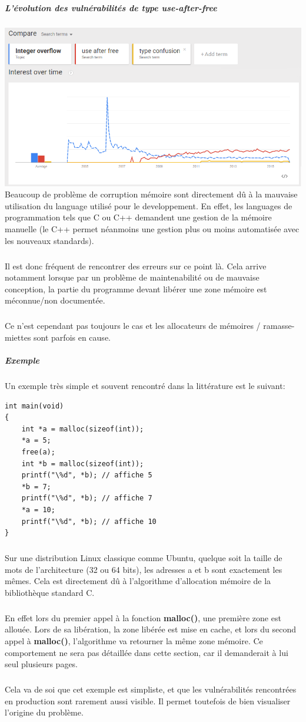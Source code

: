\subparagraph{L'évolution des vulnérabilités de type use-after-free}
\includegraphics[scale=0.5]{histogramme-uaf.png}\newline
Beaucoup de problème de corruption mémoire sont directement dû à la mauvaise utilisation
du language utilisé pour le developpement. En effet, les languages de programmation tels que C
ou C++ demandent une gestion de la mémoire manuelle (le C++ permet néanmoins une gestion plus ou moins automatisée
avec les nouveaux standards).
\subparagraph{}
Il est donc fréquent de rencontrer des erreurs sur ce point là. Cela arrive
notamment lorsque par un problème de maintenabilité ou de mauvaise conception, la partie du programme devant
libérer une zone mémoire est méconnue/non documentée.\subparagraph{}
Ce n'est cependant pas toujours le cas et les allocateurs de mémoires / ramasse-miettes sont parfois en cause.

\subparagraph{Exemple}
Un exemple très simple et souvent rencontré dans la littérature est le suivant:
\begin {lstlisting}[frame=single]
int main(void)
{
    int *a = malloc(sizeof(int));
    *a = 5;
    free(a);
    int *b = malloc(sizeof(int));
    printf("\%d", *b); // affiche 5
    *b = 7;
    printf("\%d", *b); // affiche 7
    *a = 10;
    printf("\%d", *b); // affiche 10
}
\end{lstlisting}
\subparagraph{}
Sur une distribution Linux classique comme Ubuntu, quelque soit la taille de mots
de l'architecture (32 ou 64 bits), les adresses a et b sont exactement les mêmes.
Cela est directement dû à l'algorithme d'allocation mémoire de la bibliothèque standard
C.\subparagraph{}
En effet lors du premier appel à la fonction \textbf{malloc()}, une première zone est allouée.
Lors de sa libération, la zone libérée est mise en cache, et lors du second appel à \textbf{malloc()},
l'algorithme va retourner la même zone mémoire. Ce comportement ne sera pas détaillée dans cette section, car
il demanderait à lui seul plusieurs pages.\subparagraph{}
Cela va de soi que cet exemple est simpliste, et que les vulnérabilités rencontrées en production sont
rarement aussi visible. Il permet toutefois de bien visualiser l'origine du problème.


